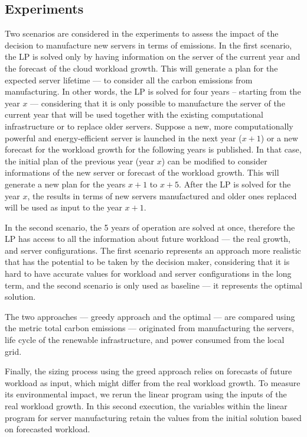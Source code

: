 \subsection{Experiments}


Two scenarios are considered in the experiments to assess the impact of the decision to manufacture new servers in terms of  emissions.  In the first scenario, the LP is solved only by having information on the server of the current year and the forecast of the cloud workload growth. This will generate a plan for the expected server lifetime --- to consider all the carbon emissions from manufacturing. In other words, the LP is solved for four years -- starting from the year $x$ --- considering that it is only possible to manufacture the server of the current year that will be used together with the existing computational infrastructure or to replace older servers. Suppose a new, more computationally powerful and energy-efficient server is launched in the next year ($x+1$) or a new forecast for the workload growth for the following years is published. In that case, the initial plan of the previous year (year $x$) can be modified to consider informations of the new server or forecast of the workload growth. This will generate a new plan for the years $x+1$ to $x+5$. After the LP is solved for the year $x$, the results in terms of new servers manufactured and older ones replaced will be used as input to the year $x +1$. 

In the second scenario, the 5 years of operation are solved at once, therefore the LP has access to all the information about future workload --- the real growth, and server configurations. The first scenario represents an approach more realistic that has the potential to be taken by the decision maker, considering that it is hard to have accurate values for workload and server configurations in the long term, and the second scenario is only used as baseline --- it represents the optimal solution.

The two approaches --- greedy approach and the optimal --- are compared using the metric total carbon emissions --- originated from manufacturing the servers, life cycle of the renewable infrastructure, and power consumed from the local grid.

Finally, the sizing process using the greed approach relies on forecasts of future workload as input, which might differ from the real workload growth. To measure its environmental impact, we rerun the linear program using the inputs of the real workload growth. In this second execution, the variables within the linear program for server manufacturing retain the values from the initial solution based on forecasted workload.


